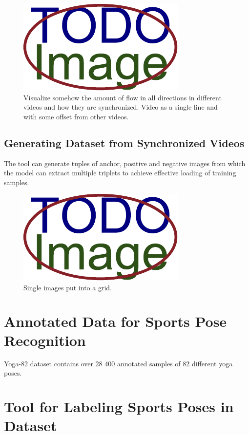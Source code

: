 \blindtext

\begin{figure}[ht]\centering
  \centering
  \includegraphics{figures/placeholder.pdf}
  \caption{Visualize somehow the amount of flow in all directions in different videos and how they are synchronized. Video as a single line and with some offset from other videos.}
  \label{VideoSynchronization}
\end{figure}

\subsection{Generating Dataset from Synchronized Videos}

The tool can generate tuples of anchor, positive and negative images from which the model can extract multiple triplets to achieve effective loading of training samples.
\blindtext

\blindtext

\begin{figure}[ht]\centering
  \centering
  \includegraphics{figures/placeholder.pdf}
  \caption{Single images put into a grid.}
  \label{GridOfImages}
\end{figure}

\blindtext

\section{Annotated Data for Sports Pose Recognition}

Yoga-82 dataset contains over 28 400 annotated samples of 82 different yoga poses.
\blindtext

\blindtext

\blindtext

\blindtext

\blindtext

\section{Tool for Labeling Sports Poses in Dataset}

\blindtext

\blindtext

\blindtext

\blindtext

\blindtext
